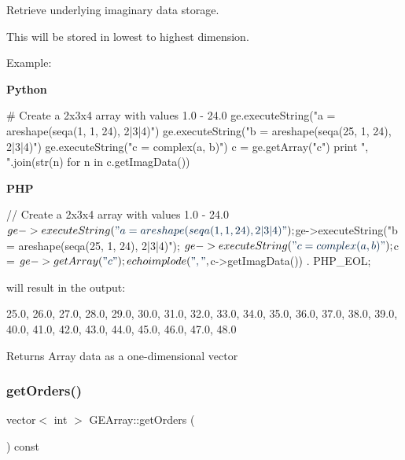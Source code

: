 Retrieve underlying imaginary data storage. 

This will be stored in lowest to highest dimension.

Example\+:

{\bfseries Python} 
\begin{DoxyCode}
\textcolor{comment}{# Create a 2x3x4 array with values 1.0 - 24.0}
ge.executeString(\textcolor{stringliteral}{"a = areshape(seqa(1, 1, 24), 2|3|4)"})
ge.executeString(\textcolor{stringliteral}{"b = areshape(seqa(25, 1, 24), 2|3|4)"})
ge.executeString(\textcolor{stringliteral}{"c = complex(a, b)"})
c = ge.getArray(\textcolor{stringliteral}{"c"})
\textcolor{keywordflow}{print} \textcolor{stringliteral}{", "}.join(str(n) \textcolor{keywordflow}{for} n \textcolor{keywordflow}{in} c.getImagData())
\end{DoxyCode}


{\bfseries P\+HP} 
\begin{DoxyCode}
\textcolor{comment}{// Create a 2x3x4 array with values 1.0 - 24.0}
$ge->executeString(\textcolor{stringliteral}{"a = areshape(seqa(1, 1, 24), 2|3|4)"});
$ge->executeString(\textcolor{stringliteral}{"b = areshape(seqa(25, 1, 24), 2|3|4)"});
$ge->executeString(\textcolor{stringliteral}{"c = complex(a, b)"});
$c = $ge->getArray(\textcolor{stringliteral}{"c"});
echo implode(\textcolor{stringliteral}{", "}, $c->getImagData()) . PHP\_EOL;
\end{DoxyCode}
 will result in the output\+: 
\begin{DoxyCode}
25.0, 26.0, 27.0, 28.0, 29.0, 30.0, 31.0, 32.0, 33.0, 34.0, 35.0, 36.0, 37.0, 38.0, 39.0, 40.0, 41.0, 42.0,
       43.0, 44.0, 45.0, 46.0, 47.0, 48.0
\end{DoxyCode}


\begin{DoxyReturn}{Returns}
Array data as a one-\/dimensional vector 
\end{DoxyReturn}
\mbox{\label{class_g_e_array_a1a0335f73a61e044895f40a8dc89b4c6}} 
\subsubsection{\texorpdfstring{get\+Orders()}{getOrders()}}
{\footnotesize\ttfamily vector$<$ int $>$ G\+E\+Array\+::get\+Orders (\begin{DoxyParamCaption}{ }\end{DoxyParamCaption}) const}



